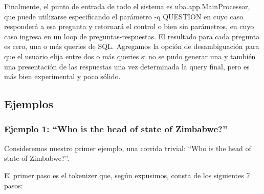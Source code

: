 Finalmente, el punto de entrada de todo el sistema es uba.app.MainProcessor, que puede utilizarse especificando el parámetro -q QUESTION en cuyo caso responderá a esa pregunta y retornará el control o bien sin parámetros, en cuyo caso ingresa en un loop de preguntas-respuestas. El resultado para cada pregunta es cero, una o más queries de SQL.
Agregamos la opción de desambiguación para que el usuario elija entre dos o más queries si no se pudo generar una y también una presentación de las respuestas una vez determinada la query final, pero es más bien experimental y poco sólido.

\subsection{Ejemplos}
\label{subsec:popescu-ejemplos}

\subsubsection*{Ejemplo 1: ``Who is the head of state of Zimbabwe?''}

Consideremos nuestro primer ejemplo, una corrida trivial: ``Who is the head of state of Zimbabwe?''.

El primer paso es el tokenizer que, según expusimos, consta de los siguientes 7 pasos:

